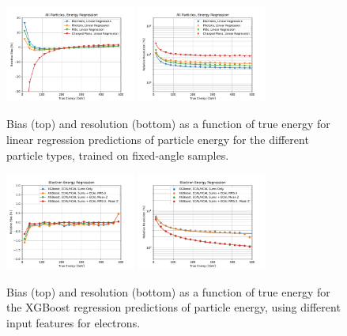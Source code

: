\begin{figure}[htbp]
\centering
\includegraphics[width=0.38\textwidth]{Images/Calo/bias_vs_E_allparts_linreg.pdf}
\includegraphics[width=0.38\textwidth]{Images/Calo/res_vs_E_allparts_linreg_fits.pdf}
\caption{Bias (top) and resolution (bottom) as a function of true energy for linear regression predictions of particle energy for the different particle types, trained on fixed-angle samples. \label{fig:reg_linreg}}
\end{figure}

\begin{figure}[htbp]
\centering
\includegraphics[width=0.38\textwidth]{Images/Calo/bias_vs_E_EleFixed_xgb_ecalmoms_zoom.pdf}
\includegraphics[width=0.38\textwidth]{Images/Calo/res_vs_E_EleFixed_xgb_ecalmoms_fits.pdf}
\caption{Bias (top) and resolution (bottom) as a function of true energy for the XGBoost regression predictions of particle energy, using different input features for electrons.\label{fig:reg_xgb_ecalmoms}}
\end{figure}

